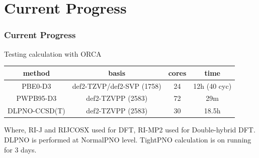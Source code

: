 \documentclass[10pt,aspectratio=43]{beamer}
\numberwithin{equation}{section}
\begin{document}
\section{Current Progress}
\begin{frame}
\frametitle{Current Progress}
Testing calculation with ORCA
\begin{table}
	\centering
	\begin{tabular}{cccc}
		\hline
		method & basis & cores & time\\ \hline
		PBE0-D3 & def2-TZVP/def2-SVP (1758) & 24 & 12h (40 cyc)\\
		PWPB95-D3 & def2-TZVPP (2583) & 72 & 29m\\
		DLPNO-CCSD(T) & def2-TZVPP (2583) & 30 & 18.5h\\
		\hline
	\end{tabular}
\end{table}
Where, RI-J and RIJCOSX used for DFT, RI-MP2 used for Double-hybrid DFT.\\
DLPNO is performed at NormalPNO level. TightPNO calculation is on running for 3 days.
\end{frame}
\end{document}
